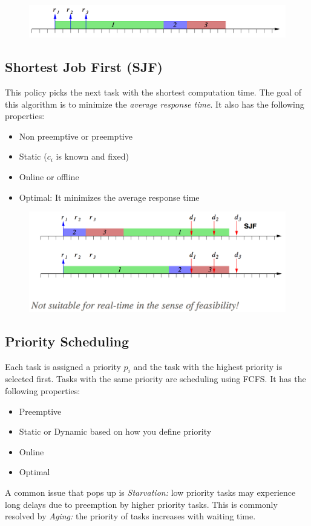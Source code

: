 \documentclass{hw}
\begin{document}
\begin{figure}[H]
  \centering
  \includegraphics[scale=.6]{fcfs2}
\end{figure}

\subsection{Shortest Job First (SJF)}
This policy picks the next task with the shortest computation time. The goal of 
this algorithm is to minimize the \emph{average response time}. It also has the
following properties:
\begin{itemize}
  \item Non preemptive or preemptive
  \item Static ($c_{i}$ is known and fixed)
  \item Online or offline
  \item Optimal: It minimizes the average response time
\end{itemize}

\begin{figure}[H]
  \centering
  \includegraphics[scale=.6]{sjf}
\end{figure}


\subsection{Priority Scheduling}
Each task is assigned a priority $p_{i}$ and the task with the highest priority
is selected first. Tasks with the same priority are scheduling using FCFS. It has
the following properties:
\begin{itemize}
  \item Preemptive
  \item Static or Dynamic based on how you define priority
  \item Online
  \item Optimal
\end{itemize}
A common issue that pops up is \emph{Starvation:} low priority tasks may 
experience long delays due to preemption by higher priority tasks. This is 
commonly resolved by \emph{Aging:} the priority of tasks increases with waiting
time.
\end{document}
